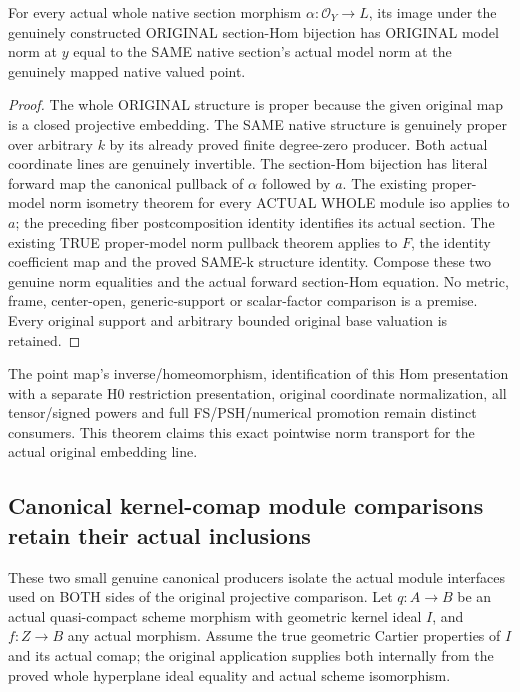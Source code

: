 \begin{theorem}
\label{thm:seven-original-native-canonical-section-model-norm-route}
\leanok
{}
For every actual whole native section morphism $\alpha:\mathcal O_Y\to
L$, its image under the genuinely constructed ORIGINAL section-Hom
bijection has ORIGINAL model norm at $y$ equal to the SAME native section's
actual model norm at the genuinely mapped native valued point.
\end{theorem}
\begin{proof}
The whole ORIGINAL structure is proper because the given original map is
a closed projective embedding. The SAME native structure is genuinely
proper over arbitrary $k$ by its already proved finite degree-zero
producer. Both actual coordinate lines are genuinely invertible. The
section-Hom bijection has literal forward map the canonical pullback of
$\alpha$ followed by $a$. The existing proper-model norm isometry theorem
for every ACTUAL WHOLE module iso applies to $a$; the preceding fiber
postcomposition identity identifies its actual section. The existing TRUE
proper-model norm pullback theorem applies to $F$, the identity coefficient
map and the proved SAME-k structure identity. Compose these two genuine
norm equalities and the actual forward section-Hom equation. No metric,
frame, center-open, generic-support or scalar-factor comparison is a
premise. Every original support and arbitrary bounded original base
valuation is retained.
\end{proof}

The point map's inverse/homeomorphism, identification of this Hom
presentation with a separate H0 restriction presentation, original
coordinate normalization, all tensor/signed powers and full FS/PSH/numerical
promotion remain distinct consumers. This theorem claims this exact
pointwise norm transport for the actual original embedding line.

\subsection{Canonical kernel-comap module comparisons retain their actual inclusions}
These two small genuine canonical producers isolate the actual module
interfaces used on BOTH sides of the original projective comparison.
Let $q:A\to B$ be an actual quasi-compact scheme morphism with geometric
kernel ideal $I$, and $f:Z\to B$ any actual morphism. Assume the true
geometric Cartier properties of $I$ and its actual comap; the original
application supplies both internally from the proved whole hyperplane
ideal equality and actual scheme isomorphism.

